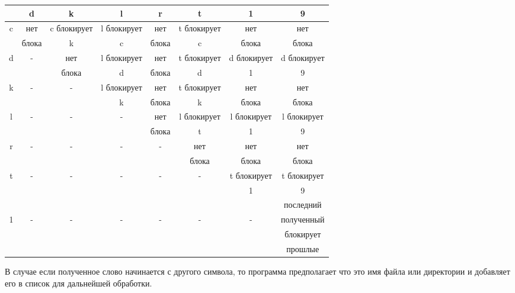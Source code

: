 \documentclass[12pt]{article}
\begin{document}
\noindent
\begin{tabular}{| c | c | c | c | c | c | c | c |}
	\hline
  & d     & k           & l           & r     & t           & 1           & 9           \\
  \hline
c & нет   & c блокирует & l блокирует & нет   & t блокирует & нет         & нет         \\
  & блока & k           & c           & блока & c           & блока       & блока       \\
  \hline
d & -     & нет         & l блокирует & нет   & t блокирует & d блокирует & d блокирует \\
  &       & блока       & d           & блока & d           & 1           & 9           \\
  \hline
k & -     & -           & l блокирует & нет   & t блокирует & нет         & нет         \\
  &       &             & k           & блока & k           & блока       & блока       \\
  \hline
l & -     & -           & -           & нет   & l блокирует & l блокирует & l блокирует \\
  &       &             &             & блока & t           & 1           & 9           \\
  \hline
r & -     & -           & -           & -     & нет         & нет         & нет         \\
  &       &             &             &       & блока       & блока       & блока       \\
  \hline
t & -     & -           & -           & -     & -           & t блокирует & t блокирует \\
  &       &             &             &       &             & 1           & 9           \\
  \hline
  &       &             &             &       &             &             & последний   \\
1 & -     & -           & -           & -     & -           & -           & полученный  \\
  &       &             &             &       &             &             & блокирует   \\
  &       &             &             &       &             &             & прошлые     \\
  \hline
\end{tabular}

В случае если полученное слово начинается с другого символа, то программа предполагает что это имя файла или директории и добавляет его в список для дальнейшей обработки.
\end{document}
